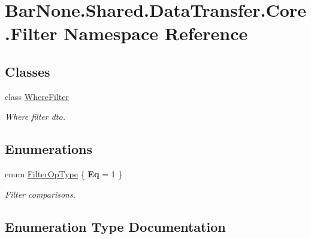 \hypertarget{namespace_bar_none_1_1_shared_1_1_data_transfer_1_1_core_1_1_filter}{}\section{Bar\+None.\+Shared.\+Data\+Transfer.\+Core.\+Filter Namespace Reference}
\label{namespace_bar_none_1_1_shared_1_1_data_transfer_1_1_core_1_1_filter}
\subsection*{Classes}
\begin{DoxyCompactItemize}
\item 
class \mbox{\hyperlink{class_bar_none_1_1_shared_1_1_data_transfer_1_1_core_1_1_filter_1_1_where_filter}{Where\+Filter}}
\begin{DoxyCompactList}\small\item\em Where filter dto. \end{DoxyCompactList}\end{DoxyCompactItemize}
\subsection*{Enumerations}
\begin{DoxyCompactItemize}
\item 
enum \mbox{\hyperlink{namespace_bar_none_1_1_shared_1_1_data_transfer_1_1_core_1_1_filter_a2a88b61b121c8cf76b6c2f4b97055daa}{Filter\+Op\+Type}} \{ {\bfseries Eq} = 1
 \}
\begin{DoxyCompactList}\small\item\em Filter comparisons. \end{DoxyCompactList}\end{DoxyCompactItemize}


\subsection{Enumeration Type Documentation}
\mbox{\label{namespace_bar_none_1_1_shared_1_1_data_transfer_1_1_core_1_1_filter_a2a88b61b121c8cf76b6c2f4b97055daa}} 
